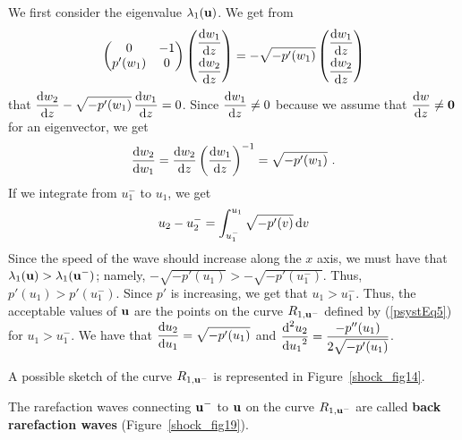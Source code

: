\begin{egg}
We first consider the eigenvalue $\lambda_1(\mathbf{u})$.  We get from
\[
\begin{pmatrix} 0 & -1 \\ p'(w_1) & 0 \end{pmatrix}
\begin{pmatrix} \displaystyle \frac{\mathrm{d}w_1}{\mathrm{d}{z}} \\[0.6em]
\displaystyle \frac{\mathrm{d}w_2}{\mathrm{d}{z}} \end{pmatrix}
= -\sqrt{-p'(w_1)} \begin{pmatrix} \displaystyle \frac{\mathrm{d}w_1}{\mathrm{d}{z}} \\[0.6em]
\displaystyle \frac{\mathrm{d}w_2}{\mathrm{d}{z}} \end{pmatrix}
\]
that
$\displaystyle \frac{\mathrm{d}w_2}{\mathrm{d}{z}} - \sqrt{-p'(w_1)} \, \frac{\mathrm{d}w_1}{\mathrm{d}{z}} = 0$.
Since $\displaystyle \frac{\mathrm{d}w_1}{\mathrm{d}{z}} \neq 0$ because we assume that
$\displaystyle \frac{\mathrm{d}w}{\mathrm{d}{z}} \neq \mathbf{0}$ for an eigenvector, we get
\[
\frac{\mathrm{d}w_2}{\mathrm{d}{w_1}} = \frac{\mathrm{d}w_2}{\mathrm{d}{z}} \left(  \frac{\mathrm{d}w_1}{\mathrm{d}{z}} \right)^{-1}
= \sqrt{-p'(w_1)} \ .
\]
If we integrate from $\displaystyle u_1^-$ to $u_1$, we get
\begin{equation} \label{psystEq5}
u_2 - u_2^- = \int_{u_1^-}^{u_1} \sqrt{-p'(v)} \,\mathrm{d}{v}
\end{equation}
Since the speed of the wave should increase along the $x$ axis, we
must have that
$\displaystyle \lambda_1(\mathbf{u}) > \lambda_1(\mathbf{u}^-)$; namely,
$\displaystyle -\sqrt{-p'(u_1)} > -\sqrt{-p'(u_1^-)}$.  Thus,
$\displaystyle p'(u_1) > p'(u_1^-)$.  Since $p'$ is increasing, we get that
$\displaystyle u_1 > u_1^-$.
Thus, the acceptable values of $\mathbf{u}$ are the points on the curve
$R_{1,\mathbf{u}^-}$ defined by (\ref{psystEq5}) for
$\displaystyle u_1 > u_1^-$.  We have that
$\displaystyle \frac{\mathrm{d}u_2}{\mathrm{d}{u_1}} = \sqrt{-p'(u_1)}$ and
$\displaystyle \frac{\displaystyle \mathrm{d}^{2}{u_2}} {\displaystyle \mathrm{d}{u_1}^{2}} = \frac{-p''(u_1)}{2\sqrt{-p'(u_1)}}$.

A possible sketch of the curve $R_{1,\mathbf{u}^-}$ is represented in
Figure~\ref{shock_fig14}.

The rarefaction waves connecting $\displaystyle \mathbf{u}^-$ to
$\mathbf{u}$ on the curve $R_{1,\mathbf{u}^-}$ are called {\bfseries back rarefaction
waves}
(Figure~\ref{shock_fig19}).



\end{egg}
